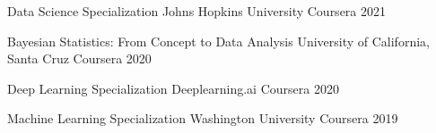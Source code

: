 

\begin{cvhonors}

    
                \cvhonor
            {Data Science Specialization} %
        {Johns Hopkins University Coursera} %
    {} %
    {2021} %
    
            \cvhonor
            {Bayesian Statistics: From Concept to Data Analysis} %
        {University of California, Santa Cruz Coursera} %
    {} %
    {2020} %


            \cvhonor
        {Deep Learning Specialization} %
        {Deeplearning.ai Coursera} %
    {} %
    {2020} %
%     
    
     \cvhonor
        {Machine Learning Specialization} %
  {Washington University Coursera} %
    {} %
    {2019} %
  

\end{cvhonors}
